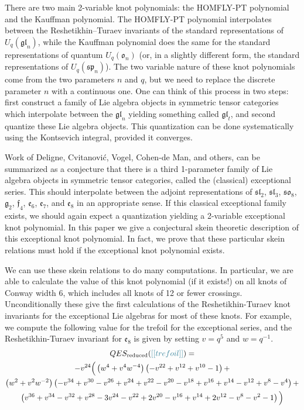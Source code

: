 \documentclass[12pt]{amsart}
\begin{document}
There are two main 2-variable knot polynomials: the HOMFLY-PT polynomial and
the Kauffman polynomial.  The HOMFLY-PT polynomial interpolates between the
Reshetikhin--Turaev invariants of the standard representations of
$U_q(\mathfrak{gl}_n)$, while the Kauffman polynomial does the same for the
standard representations of quantum $U_q(\mathfrak{o}_n)$ (or, in a slightly
different form, the standard representations of $U_q(\mathfrak{sp}_n)$).  The
two variable nature of these knot polynomials come from the two parameters $n$
and $q$, but we need to replace the discrete parameter $n$ with a continuous
one.   One can think of this process in two steps: first construct a family of
Lie algebra objects in symmetric tensor categories which interpolate between
the $\mathfrak{gl}_n$ yielding something called $\mathfrak{gl}_t$, and second
quantize these Lie algebra objects.   This quantization can be done
systematically using the Kontsevich integral, provided it converges.

Work of Deligne, Cvitanović, Vogel, Cohen-de Man, and others, can be
summarized as a conjecture that there is a third 1-parameter family of Lie
algebra objects in symmetric tensor categories, called the (classical)
exceptional series. This should interpolate between the adjoint
representations of $\mathfrak{sl}_2$, $\mathfrak{sl}_3$, $\mathfrak{so}_8$,
$\mathfrak{g}_2$, $\mathfrak{f}_4$, $\mathfrak{e}_6$, $\mathfrak{e}_7$, and
$\mathfrak{e}_8$ in an appropriate sense.  If this classical exceptional
family exists, we should again expect a quantization yielding a 2-variable
exceptional knot polynomial.  In this paper we give a conjectural skein
theoretic description of this exceptional knot polynomial. In fact, we prove
that these particular skein relations must hold if the exceptional knot
polynomial exists.

We can use these skein relations to do many computations.  In particular, we
are able to calculate the value of this knot polynomial (if it exists!) on all
knots of Conway width 6, which includes all knots of 12 or fewer crossings.
Unconditionally these give the first calculations of the Reshetikhin-Turaev
knot invariants for the exceptional Lie algebras for most of these knots.  For
example, we compute the following value for the trefoil for the exceptional
series, and the Reshetikhin-Turaev invariant for $\mathfrak{e}_8$ is given by
setting $v=q^5$ and $w=q^{-1}$.
\begin{multline*}
QES_{\text{reduced}}(\nn{trefoil}) = \\
-v^{24}
\Big(
    \left(w^4 + v^4 w^{-4}\right)\left(-v^{22}+v^{12}+v^{10}-1\right)+\\
    \left(w^2 + v^2 w^{-2}\right)\left(-v^{34}+v^{30}-v^{26}+v^{24}+v^{22}-v^{20}-v^{18}+v^{16}+v^{14}-v^{12}+v^8-v^4\right)+\\
    \left(v^{36}+v^{34}-v^{32}+v^{28}-3 v^{24}-v^{22}+2 v^{20}-v^{16}+v^{14}+2 v^{12}-v^8-v^2-1\right)
    \Big)
\end{multline*}
\end{document}

